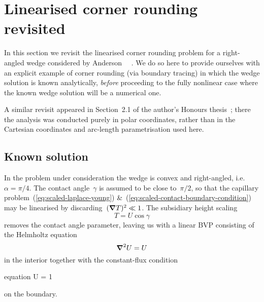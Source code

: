 \section{Linearised corner rounding revisited}
\label{sec:moderate.linearised}

In this section we revisit the linearised corner rounding problem
for a right-angled wedge
considered by Anderson~\etal~%
  \cite{anderson-2007-boundary-tracing-ii-applications}.
We do so here to provide ourselves
with an explicit example of corner rounding (via boundary tracing)
in which the wedge solution is known analytically,
\emph{before} proceeding to the fully nonlinear case
where the known wedge solution will be a numerical one.

A similar revisit appeared in Section~2.1 of
the author's Honours thesis~\cite{li-2017-thesis-rounding-capillary-wedge};
there the analysis was conducted purely in polar coordinates,
rather than in the Cartesian coordinates and arc-length parametrisation
used here.

\subsection{Known solution}
\label{sec:moderate.linearised.known}

In the problem under consideration
the wedge is convex and right-angled, i.e.~$\alpha = \pi/4$.
The contact angle~$\gamma$ is assumed to be close to~$\pi/2$,
so that the capillary problem~(\ref{eq:scaled-laplace-young})
\&~(\ref{eq:scaled-contact-boundary-condition})
may be linearised by discarding~$(\mathop{}\!\boldsymbol{\mathbf{\nabla}} T)^2 \ll 1$.
The subsidiary height scaling
\begin{equation}
  T = U \cos\gamma
  \label{eq:helmholtz-height-scaling}
\end{equation}
removes the contact angle parameter,
leaving us with a linear BVP consisting of
the Helmholtz equation
\begin{equation}
  \mathop{}\!\boldsymbol{\mathbf{\nabla}}^2 U = U
  \label{eq:scaled-helmholtz}
\end{equation}
in the interior
together with the constant-flux condition
\begin{important}{equation}
  \normalvec \dotp \del U = 1
  \label{eq:scaled-contact-linearised}
\end{important}
on the boundary.

\begin{figure}
  \begin{minipage}[t]{0.4\textwidth}
  \end{minipage}
  \hfill
  \begin{minipage}[t]{0.55\textwidth}
  \end{minipage}
\end{figure}

